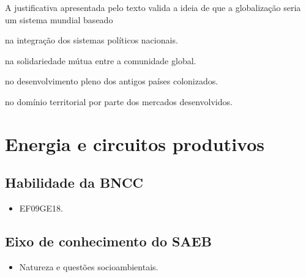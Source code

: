 A justificativa apresentada pelo texto valida a ideia de que a
globalização seria um sistema mundial baseado

\begin{escolha}
\item
  na integração dos sistemas políticos nacionais.
\item
  na solidariedade mútua entre a comunidade global.
\item
  no desenvolvimento pleno dos antigos países colonizados.
\item
  no domínio territorial por parte dos mercados desenvolvidos.
\end{escolha}


\chapter{Energia e circuitos produtivos}


\section{Habilidade da BNCC}

\begin{itemize}
  \item 
EF09GE18.
\end{itemize}

\section{Eixo de conhecimento do SAEB}

\begin{itemize}
\item Natureza e questões socioambientais.
\end{itemize}

